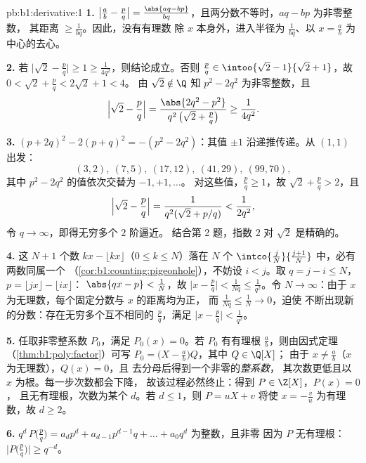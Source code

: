 \begin{solution}{pb:b1:derivative:1}
\textbf{1.} $\bigl|\frac ab - \frac pq\bigr| = \frac{\abs{aq -
bp}}{bq}$，且两分数不等时，$aq - bp$ 为非零整数，
其距离 $\geq \frac{1}{bq}$。因此，没有有理数
除 $x$ 本身外，进入半径为
$\frac{1}{bq}$、以 $x = \frac ab$ 为中心的去心。

\textbf{2.} 若 $\bigl|\sqrt2 - \frac pq\bigr| \geq 1 \geq
\frac{1}{4q^2}$，则结论成立。否则 $\frac pq \in \intoo{\sqrt2 -
1}{\sqrt2 + 1}$，故 $0 < \sqrt2 + \frac pq < 2\sqrt2 + 1 < 4$。
由 $\sqrt 2 \notin \Q$ 知 $p^2 - 2q^2$ 为非零整数，且
\[
\Bigl|\sqrt2 - \frac pq\Bigr|
= \frac{\abs{2q^2 - p^2}}{q^2\,\bigl(\sqrt2 + \frac pq\bigr)}
\geq \frac{1}{4q^2} .
\]

\textbf{3.} $(p + 2q)^2 - 2(p + q)^2 = -(p^2 - 2q^2)$：其值
$\pm1$ 沿递推传递。从 $(1,1)$ 出发：
\[
(3,2),\ (7,5),\ (17,12),\ (41,29),\ (99,70),
\]
其中 $p^2 - 2q^2$ 的值依次交替为 $-1, +1, \dots$。
对这些值，$\frac pq \geq 1$，故 $\sqrt2 + \frac pq > 2$，且
\[
\Bigl|\sqrt2 - \frac pq\Bigr| =
\frac{1}{q^2(\sqrt2 + p/q)} < \frac{1}{2q^2} ,
\]
令 $q \to \infty$，即得无穷多个 $2$ 阶逼近。
结合第 2 题，指数 $2$ 对 $\sqrt 2$ 是精确的。

\textbf{4.} 这 $N + 1$ 个数 $kx - \lfloor kx\rfloor$（$0
\leq k \leq N$）落在 $N$ 个 $\intco{\frac
jN}{\frac{j+1}{N}}$ 中，必有两数同属一个
（\cref{cor:b1:counting:pigeonhole}），不妨设 $i < j$。取 $q =
j - i \leq N$，$p = \lfloor jx\rfloor - \lfloor ix\rfloor$：
$\abs{qx - p} < \frac1N$，故 $\bigl|x - \frac pq\bigr| <
\frac{1}{Nq} \leq \frac{1}{q^2}$。令 $N \to \infty$：由于
$x$ 为无理数，每个固定分数与 $x$ 的距离均为正，
而 $\frac{1}{Nq} \leq \frac 1N \to 0$，迫使
不断出现新的分数：存在无穷多个互不相同的 $\frac pq$，满足
$\bigl|x - \frac pq\bigr| < \frac{1}{q^2}$。

\textbf{5.} 任取非零整系数 $P_0$，满足 $P_0(x) =
0$。若 $P_0$ 有有理根 $\frac ab$，则由因式定理
（\cref{thm:b1:poly:factor}）可写 $P_0 = \bigl(X - \frac
ab\bigr)Q$，其中 $Q \in \Q[X]$；
由于 $x \neq \frac ab$（$x$ 为无理数），$Q(x) = 0$，且
去分母后得到一个非零的\emph{整系数}，
其次数更低且以 $x$ 为根。每一步次数都会下降，
故该过程必然终止：得到 $P \in \Z[X]$，$P(x) = 0$，
且无有理根，次数为某个 $d$。若 $d \leq 1$，则 $P =
uX + v$ 将使 $x = -\frac vu$ 为有理数，故 $d \geq 2$。

\textbf{6.} $q^d\,P\bigl(\frac pq\bigr) = a_d p^d + a_{d-1}
p^{d-1} q + \dots + a_0 q^d$ 为整数，且非零
因为 $P$ 无有理根：$\bigl|P\bigl(\frac
pq\bigr)\bigr| \geq q^{-d}$。


\end{solution}
